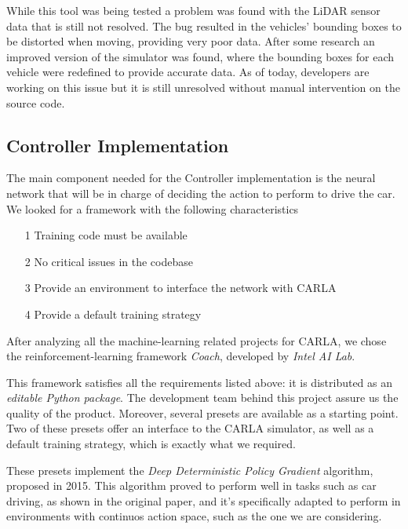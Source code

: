 While this tool was being tested a problem was found with the LiDAR sensor data that is still not resolved.\cite{lidarbug} 
The bug resulted in the vehicles' bounding boxes to be distorted when moving, providing very poor data.
After some research an improved version of the simulator was found, where the bounding boxes for each vehicle were redefined to provide accurate data.\cite{carlapro} As of today, developers are working on this issue but it is still unresolved without manual intervention on the source code.


\subsection{Controller Implementation}

The main component needed for the Controller implementation is the neural network that will be in charge of deciding the action to perform to drive the car. We looked for a framework with the following characteristics

\begin{itemize}
	\item[1] Training code must be available
	\item[2] No critical issues in the codebase
	\item[3] Provide an environment to interface the network with CARLA
	\item[4] Provide a default training strategy
\end{itemize}

After analyzing all the machine-learning related projects for CARLA, we chose the reinforcement-learning framework \textsl{Coach}, developed by \textsl{Intel AI Lab}.\cite{coach}

This framework satisfies all the requirements listed above: it is distributed as an \textsl{editable Python package}. The development team behind this project assure us the quality of the product. Moreover, several presets are available as a starting point. Two of these presets offer an interface to the CARLA simulator, as well as a default training strategy, which is exactly what we required.

These presets implement the \textsl{Deep Deterministic Policy Gradient} algorithm, proposed in 2015.\cite{ddpg} This algorithm proved to perform well in tasks such as car driving, as shown in the original paper, and it's specifically adapted to perform in environments with continuos action space, such as the one we are considering.

